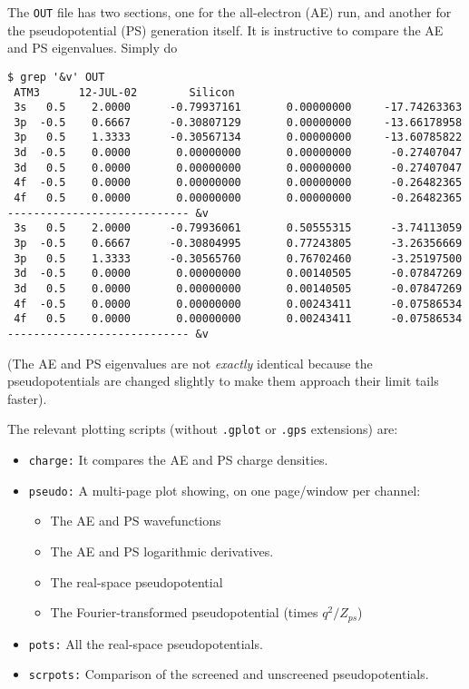 \documentclass[11pt]{article}
\begin{document}
The {\tt OUT} file has two sections, one for the all-electron (AE) run, and
another for the pseudopotential (PS) generation itself. It is instructive to
compare the AE and PS eigenvalues. Simply do

\begin{verbatim}
$ grep '&v' OUT
 ATM3      12-JUL-02        Silicon
 3s   0.5    2.0000      -0.79937161       0.00000000     -17.74263363
 3p  -0.5    0.6667      -0.30807129       0.00000000     -13.66178958
 3p   0.5    1.3333      -0.30567134       0.00000000     -13.60785822
 3d  -0.5    0.0000       0.00000000       0.00000000      -0.27407047
 3d   0.5    0.0000       0.00000000       0.00000000      -0.27407047
 4f  -0.5    0.0000       0.00000000       0.00000000      -0.26482365
 4f   0.5    0.0000       0.00000000       0.00000000      -0.26482365
---------------------------- &v
 3s   0.5    2.0000      -0.79936061       0.50555315      -3.74113059
 3p  -0.5    0.6667      -0.30804995       0.77243805      -3.26356669
 3p   0.5    1.3333      -0.30565760       0.76702460      -3.25197500
 3d  -0.5    0.0000       0.00000000       0.00140505      -0.07847269
 3d   0.5    0.0000       0.00000000       0.00140505      -0.07847269
 4f  -0.5    0.0000       0.00000000       0.00243411      -0.07586534
 4f   0.5    0.0000       0.00000000       0.00243411      -0.07586534
---------------------------- &v
\end{verbatim}

(The AE and PS eigenvalues are not {\sl exactly} identical because the
pseudopotentials are changed slightly to make them approach their
limit tails faster).

The relevant plotting scripts (without {\tt .gplot} or {\tt .gps}
extensions) are:

\begin{itemize}
\item {\tt charge:} It compares the AE and PS charge densities.
\item {\tt pseudo:} A multi-page plot showing, on one page/window per
channel:
\begin{itemize}
\item The AE and PS wavefunctions
\item The AE and PS logarithmic derivatives.
\item The real-space pseudopotential
\item The Fourier-transformed pseudopotential (times $q^2/Z_{ps}$)
\end{itemize}
\item {\tt pots:} All the real-space pseudopotentials.
\item {\tt scrpots:} Comparison of the screened and unscreened
pseudopotentials.
\end{itemize}
\end{document}
